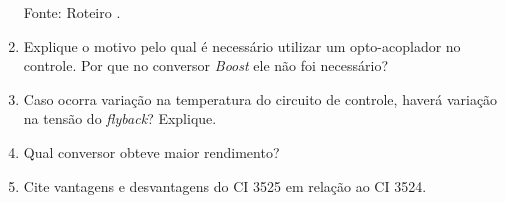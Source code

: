 \begin{enumerate}
\begin{small}
\begin{table}[H]
\begin{center}
                \small Fonte: Roteiro \cite{Roteiro}.
              \end{center}
            \end{table}
          \end{small}
          
          \item Explique o motivo pelo qual é necessário utilizar um opto-acoplador no controle. Por que no conversor \textit{Boost} ele não foi necessário?
          
          \item Caso ocorra variação na temperatura do circuito de controle, haverá variação na tensão do \textit{flyback}? Explique.
          
          \item Qual conversor obteve maior rendimento?
          
          \item Cite vantagens e desvantagens do CI 3525 em relação ao CI 3524.
        \end{enumerate}
 
         